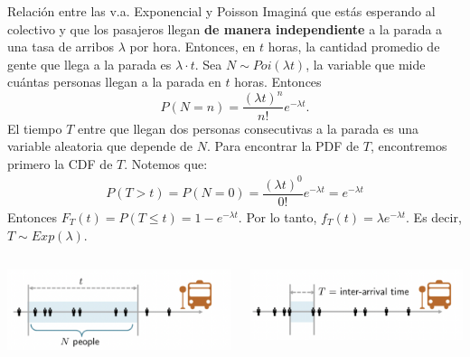 \documentclass{beamer}
\theoremstyle{definition}
\begin{document}
\begin{frame}{\color{rosee}\color{rosee}Relaci\'on entre las v.a. Exponencial y Poisson}
\small
Imagin\'a que est\'as esperando al colectivo y que los pasajeros llegan \textbf{de manera independiente} a la parada a una tasa de arribos $\lambda$  por hora. Entonces, en $t$ horas, la cantidad promedio de gente que llega a la parada es $\lambda \cdot t$. Sea $N\sim Poi(\lambda t)$, la variable que mide cu\'antas personas llegan a la parada en $t$ horas. Entonces
\[P(N=n)=\dfrac{(\lambda t)^n}{n!}e^{-\lambda t}.\]
El tiempo $T$ entre que llegan dos personas consecutivas a la parada es una variable aleatoria que depende de $N$. Para encontrar la PDF de $T$, encontremos primero la CDF de $T$. Notemos que:
\begin{align*}
    P(T>t)=P(N=0)=\dfrac{(\lambda t)^0}{0!}e^{-\lambda t}=e^{-\lambda t}
\end{align*}
Entonces $F_T(t)=P(T \leq t)=1-e^{-\lambda t}$. Por lo tanto, $f_T(t)=\lambda e^{-\lambda t}$. Es decir, $T\sim Exp(\lambda)$.
      \begin{columns}
    \begin{column}{0.5\linewidth}
\includegraphics[scale=0.5]{img/poissonexpo1.png}
    \end{column}    
     \begin{column}{0.5\linewidth}
\includegraphics[scale=0.5]{img/poissonexpo2.png}
    \end{column} 
      \end{columns}
\end{frame}
\end{document}
